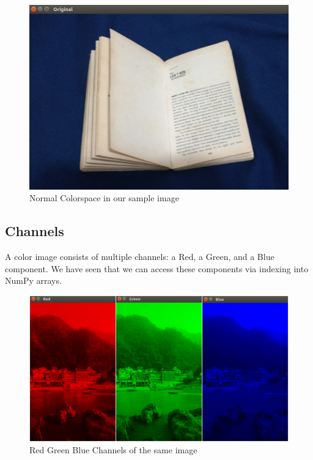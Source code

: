 \documentclass[BTech]{srmuthesis}
\begin{document}
\begin{figure}[!hb]
    \centering
    \includegraphics[width=15cm\textwidth]{normal_colorspace}
    \caption{Normal Colorspace in our sample image}
    \label{fig:Normal Colorspace}
\end{figure}

\newpage

\subsection{Channels}

A color image consists of multiple channels: a Red, a Green, and a Blue component. We have seen that we can access these components via indexing into NumPy arrays.

\begin{figure}[!hb]
    \centering
    \includegraphics[width=15cm\textwidth]{channels}
    \caption{Red Green Blue Channels of the same image}
    \label{fig:Red Green Blue Channels of the same image}
\end{figure}
\end{document}
